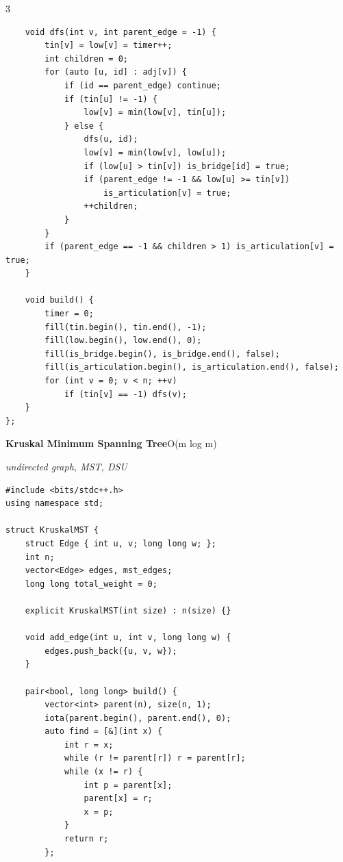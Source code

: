 \documentclass[8pt,a4paper,landscape]{article}
\begin{document}
\begin{multicols}{3}
\begin{lstlisting}
    void dfs(int v, int parent_edge = -1) {
        tin[v] = low[v] = timer++;
        int children = 0;
        for (auto [u, id] : adj[v]) {
            if (id == parent_edge) continue;
            if (tin[u] != -1) {
                low[v] = min(low[v], tin[u]);
            } else {
                dfs(u, id);
                low[v] = min(low[v], low[u]);
                if (low[u] > tin[v]) is_bridge[id] = true;
                if (parent_edge != -1 && low[u] >= tin[v])
                    is_articulation[v] = true;
                ++children;
            }
        }
        if (parent_edge == -1 && children > 1) is_articulation[v] = true;
    }

    void build() {
        timer = 0;
        fill(tin.begin(), tin.end(), -1);
        fill(low.begin(), low.end(), 0);
        fill(is_bridge.begin(), is_bridge.end(), false);
        fill(is_articulation.begin(), is_articulation.end(), false);
        for (int v = 0; v < n; ++v)
            if (tin[v] == -1) dfs(v);
    }
};
\end{lstlisting}
\vspace{1pt}
\textbf{Kruskal Minimum Spanning Tree}\hfill{\scriptsize O(m log m)}\par
{\scriptsize\itshape undirected graph, MST, DSU}\par
\begin{lstlisting}
#include <bits/stdc++.h>
using namespace std;

struct KruskalMST {
    struct Edge { int u, v; long long w; };
    int n;
    vector<Edge> edges, mst_edges;
    long long total_weight = 0;

    explicit KruskalMST(int size) : n(size) {}

    void add_edge(int u, int v, long long w) {
        edges.push_back({u, v, w});
    }

    pair<bool, long long> build() {
        vector<int> parent(n), size(n, 1);
        iota(parent.begin(), parent.end(), 0);
        auto find = [&](int x) {
            int r = x;
            while (r != parent[r]) r = parent[r];
            while (x != r) {
                int p = parent[x];
                parent[x] = r;
                x = p;
            }
            return r;
        };


\end{lstlisting}
\end{multicols}
\end{document}
